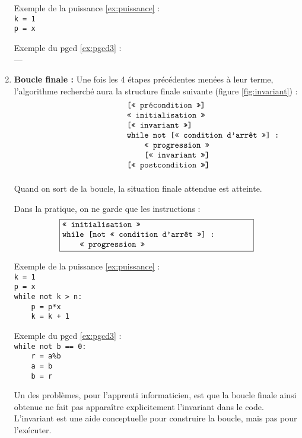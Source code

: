 \begin{enumerate}
	\begin{minipage}[t]{6cm}
	Exemple de la puissance \ref{ex:puissance} :\\
	{\tt k = 1}\\
	{\tt p = x}
	\end{minipage}
	\hfill
	\begin{minipage}[t]{6cm}
	Exemple du pgcd \ref{ex:pgcd3} :\\
	---
	\end{minipage}
\item {\bf Boucle finale :} Une fois les 4 étapes précédentes menées à leur terme, l'algorithme recherché 
	aura la structure finale suivante (figure \ref{fig:invariant}) :
	$$\begin{minipage}[t]{4cm}
	\begin{verbatim}
	[« précondition »]
	« initialisation »
	[« invariant »]
	while not [« condition d'arrêt »] :
	    « progression »
	    [« invariant »]
	[« postcondition »]
	\end{verbatim}
	\end{minipage}$$
	Quand on sort de la boucle, la situation finale attendue est atteinte.
	
	Dans la pratique, on ne garde que les instructions :
	$$\fbox{\begin{minipage}[t]{8cm}\tt
	« initialisation »\\
	while [not « condition d'arrêt »] : \\
	\mbox{}\ \ \ \ « progression »
	\end{minipage}}$$
	\begin{minipage}[t]{6cm}
	Exemple de la puissance \ref{ex:puissance} :\\
	{\tt k = 1}\\
	{\tt p = x}\\
	{\tt while not k > n: }\\
	{\tt \mbox{}\ \ \ \ p = p*x}\\
	{\tt \mbox{}\ \ \ \ k = k + 1}
	\end{minipage}
	\hfill
	\begin{minipage}[t]{6cm}
	Exemple du pgcd \ref{ex:pgcd3} :\\
	{\tt while not b == 0:}\\
	{\tt \mbox{}\ \ \ \ r = a\%b}\\
	{\tt \mbox{}\ \ \ \ a = b}\\
	{\tt \mbox{}\ \ \ \ b = r}
	\end{minipage}
	\vspace*{2mm}
	
	Un des problèmes, pour l'apprenti informaticien, est que la boucle finale
	ainsi obtenue ne fait pas apparaître explicitement l'invariant dans le code. 
	L'invariant est une aide conceptuelle pour construire la boucle, 
	mais pas pour l'exécuter.
\end{enumerate}
